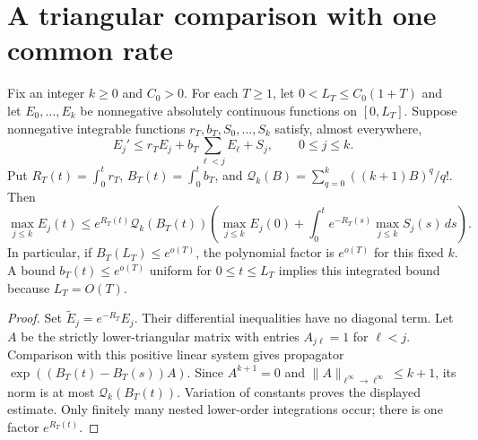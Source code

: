 \section{A triangular comparison with one common rate}
\label{app:triangular}

\begin{lemma}
\label{pk:triangular-comparison}
Fix an integer $k\ge0$ and $C_0>0$. For each $T\ge1$, let
$0<L_T\le C_0(1+T)$ and let $E_0,\ldots,E_k$ be nonnegative
absolutely continuous functions on $[0,L_T]$. Suppose nonnegative
integrable functions $r_T,b_T,S_0,\ldots,S_k$ satisfy, almost everywhere,
\[
 E_j'\le r_TE_j+b_T\sum_{\ell<j}E_\ell+S_j,
 \qquad 0\le j\le k.
\]
Put $R_T(t)=\int_0^t r_T$, $B_T(t)=\int_0^t b_T$, and
$\mathcal Q_k(B)=\sum_{q=0}^k((k+1)B)^q/q!$. Then
\[
 \max_{j\le k}E_j(t)
 \le e^{R_T(t)}\mathcal Q_k(B_T(t))
 \left(\max_{j\le k}E_j(0)
       +\int_0^t e^{-R_T(s)}\max_{j\le k}S_j(s)\,ds\right).
\]
In particular, if $B_T(L_T)\le e^{o(T)}$, the polynomial factor
is $e^{o(T)}$ for this fixed $k$. A bound $b_T(t)\le e^{o(T)}$ uniform for $0\le t\le L_T$
implies this integrated bound because $L_T=O(T)$.
\end{lemma}
\begin{proof}
Set $\widetilde E_j=e^{-R_T}E_j$. Their differential inequalities
have no diagonal term. Let $A$ be the strictly lower-triangular matrix
with entries $A_{j\ell}=1$ for $\ell<j$. Comparison with this positive
linear system gives propagator $\exp((B_T(t)-B_T(s))A)$.
Since $A^{k+1}=0$ and $\|A\|_{\ell^\infty\to\ell^\infty}\le k+1$,
its norm is at most $\mathcal Q_k(B_T(t))$. Variation of constants
proves the displayed estimate. Only finitely many nested lower-order
integrations occur; there is one factor $e^{R_T(t)}$.
\end{proof}
